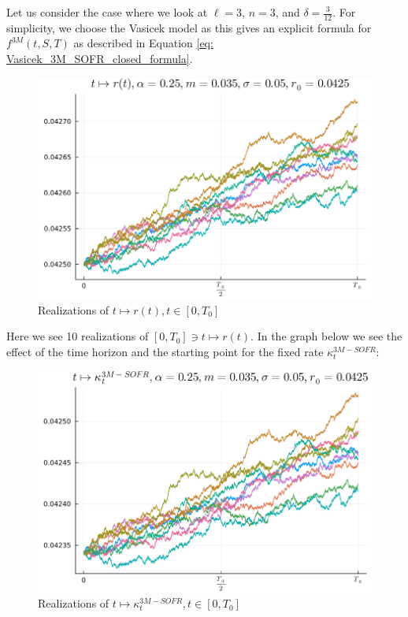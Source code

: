 \newpage 

Let us consider the case where we look at $\ell=3$, $n=3$, and $\delta = \frac{3}{12}$. For simplicity, we choose the Vasicek model as this gives an explicit formula for $f^{3M}(t,S,T)$ as described in Equation \ref{eq: Vasicek_3M_SOFR_closed_formula}.

\begin{figure}[htp]
    \centering
    \includegraphics[width=12cm]{figures/SOFR/1M_Vasicek_relaizations.PNG}
    \caption{Realizations of $t \mapsto r(t), t \in [0,T_{0}]$}
    \label{fig: Vasicek_paths}
\end{figure}

Here we see 10 realizations of $[0,T_{0}] \ni t \mapsto r(t)$. In the graph below we see the effect of the time horizon and the starting point for the fixed rate $\kappa_{t}^{3M-SOFR}$:


\begin{figure}[htp]
    \centering
    \includegraphics[width=12cm]{figures/SOFR/3M_SOFR_swap_rate_Vasicek.PNG}
    \caption{Realizations of $t \mapsto \kappa_{t}^{3M-SOFR}, t \in [0,T_{0}]$}
    \label{fig: 3M_SOFR_swap_rate}
\end{figure}

